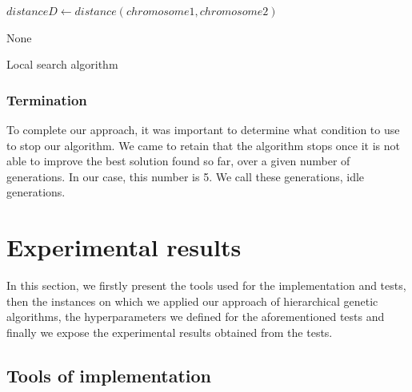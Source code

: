 \documentclass[twocolumn,10pt]{asme2ej}
\begin{document}
\begin{algorithm}[!ht]
\DontPrintSemicolon
    $distanceD \gets distance(chromosome1, chromosome2) $\;
    
    \Return None

\caption{Local search algorithm}
\label{algo:localS}
\end{algorithm}

\subsubsection{Termination}

To complete our approach, it was important to determine what condition to use to stop our algorithm. We came to retain that the algorithm stops once it is not able to improve the best solution found so far, over a given number of generations. In our case, this number is 5. We call these generations, idle generations.

\section{Experimental results \protect\footnotemark}

In this section, we firstly present the tools used for the implementation and tests, then the instances on which we applied our approach of hierarchical genetic algorithms, the hyperparameters we defined for the aforementioned tests and finally we expose the experimental results obtained from the tests.

\subsection{Tools of implementation}
\end{document}
